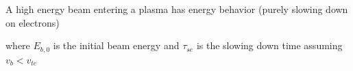 \noindent A high energy beam entering a plasma has energy behavior (purely slowing down on electrons) 


\noindent where $E_{b,0}$ is the initial beam energy and $\tau_{se}$ is the slowing down time assuming $v_b < v_{te}$ 


%
%
%
